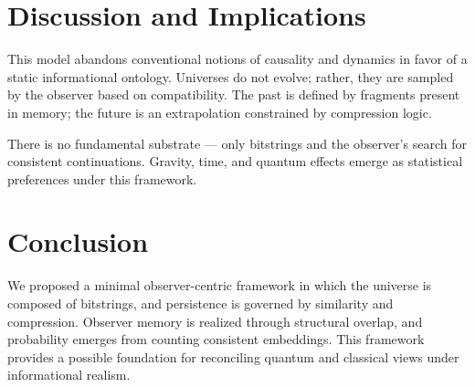 \documentclass[12pt]{article}
\begin{document}
\section{Discussion and Implications}

This model abandons conventional notions of causality and dynamics in favor of a static informational ontology. Universes do not evolve; rather, they are sampled by the observer based on compatibility. The past is defined by fragments present in memory; the future is an extrapolation constrained by compression logic.

There is no fundamental substrate — only bitstrings and the observer's search for consistent continuations. Gravity, time, and quantum effects emerge as statistical preferences under this framework.

\section{Conclusion}

We proposed a minimal observer-centric framework in which the universe is composed of bitstrings, and persistence is governed by similarity and compression. Observer memory is realized through structural overlap, and probability emerges from counting consistent embeddings. This framework provides a possible foundation for reconciling quantum and classical views under informational realism.

\ifmain
\else
\end{document}
